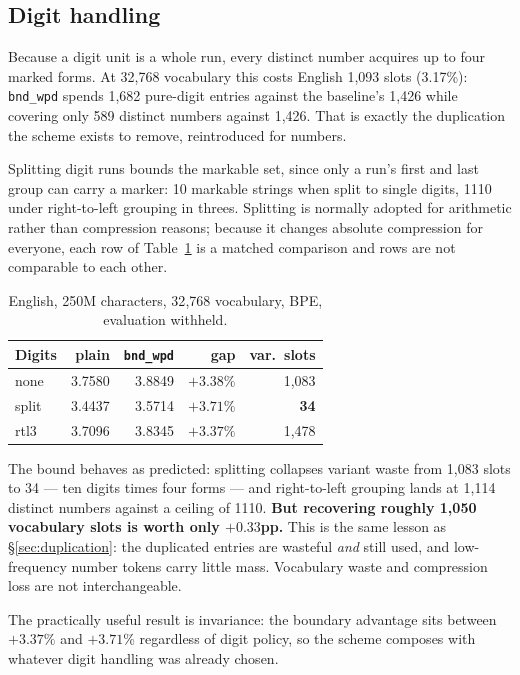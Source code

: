 \documentclass[11pt]{article}
\newcommand{\bnd}[1]{\texttt{bnd\_#1}}
\begin{document}
\subsection{Digit handling}
\label{sec:digits}

Because a digit unit is a whole run, every distinct number acquires up to four marked forms.
At 32{,}768 vocabulary this costs English 1{,}093 slots (3.17\%): \bnd{wpd} spends 1{,}682
pure-digit entries against the baseline's 1{,}426 while covering only 589 distinct numbers
against 1{,}426. That is exactly the duplication the scheme exists to remove, reintroduced
for numbers.

Splitting digit runs bounds the markable set, since only a run's first and last group can
carry a marker: 10 markable strings when split to single digits, 1110 under right-to-left
grouping in threes. Splitting is normally adopted for arithmetic rather than compression
reasons; because it changes absolute compression for everyone, each row of
Table~\ref{tab:digits} is a matched comparison and rows are not comparable to each other.

\begin{table}[t]
\centering
\small
\begin{tabular}{lrrrr}
\toprule
Digits & plain & \bnd{wpd} & gap & var.\ slots \\
\midrule
none    & 3.7580 & 3.8849 & $+3.38\%$ & 1{,}083 \\
split   & 3.4437 & 3.5714 & $+3.71\%$ & \textbf{34} \\
rtl3    & 3.7096 & 3.8345 & $+3.37\%$ & 1{,}478 \\
\bottomrule
\end{tabular}
\caption{English, 250M characters, 32{,}768 vocabulary, BPE, evaluation withheld.}
\label{tab:digits}
\end{table}

The bound behaves as predicted: splitting collapses variant waste from 1{,}083 slots to 34
--- ten digits times four forms --- and right-to-left grouping lands at 1{,}114 distinct
numbers against a ceiling of 1110. \textbf{But recovering roughly 1{,}050 vocabulary slots
is worth only $+0.33$pp.} This is the same lesson as \S\ref{sec:duplication}: the duplicated
entries are wasteful \emph{and} still used, and low-frequency number tokens carry little
mass. Vocabulary waste and compression loss are not interchangeable.

The practically useful result is invariance: the boundary advantage sits between $+3.37\%$
and $+3.71\%$ regardless of digit policy, so the scheme composes with whatever digit
handling was already chosen.
\end{document}

